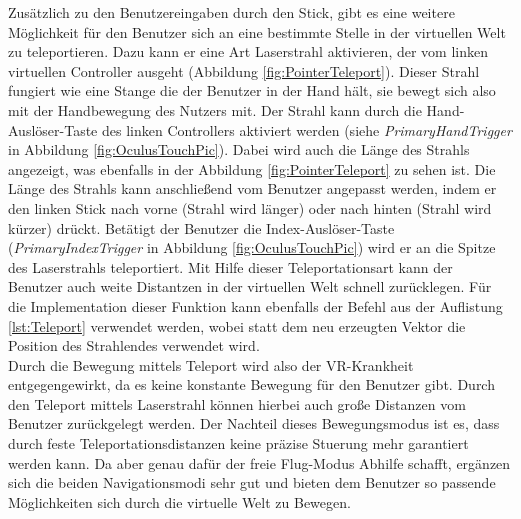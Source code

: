 Zusätzlich zu den Benutzereingaben durch den Stick, gibt es eine weitere Möglichkeit für den Benutzer sich an eine bestimmte Stelle in der virtuellen Welt zu teleportieren. Dazu kann er eine Art Laserstrahl aktivieren, der vom linken virtuellen Controller ausgeht (Abbildung \ref{fig:PointerTeleport}). Dieser Strahl fungiert wie eine Stange die der Benutzer in der Hand hält, sie bewegt sich also mit der Handbewegung des Nutzers mit. Der Strahl kann durch die Hand-Auslöser-Taste des linken Controllers aktiviert werden (siehe \textit{PrimaryHandTrigger} in Abbildung \ref{fig:OculusTouchPic}). Dabei wird auch die Länge des Strahls angezeigt, was ebenfalls in der Abbildung \ref{fig:PointerTeleport} zu sehen ist. Die Länge des Strahls kann anschließend vom Benutzer angepasst werden, indem er den linken Stick nach vorne (Strahl wird länger) oder nach hinten (Strahl wird kürzer) drückt. Betätigt der Benutzer die Index-Auslöser-Taste (\textit{PrimaryIndexTrigger} in Abbildung \ref{fig:OculusTouchPic}) wird er an die Spitze des Laserstrahls teleportiert. Mit Hilfe dieser Teleportationsart kann der Benutzer auch weite Distantzen in der virtuellen Welt schnell zurücklegen. Für die Implementation dieser Funktion kann ebenfalls der Befehl aus der Auflistung \ref{lst:Teleport} verwendet werden, wobei statt dem neu erzeugten Vektor die Position des Strahlendes verwendet wird.\\

Durch die Bewegung mittels Teleport wird also der VR-Krankheit entgegengewirkt, da es keine konstante Bewegung für den Benutzer gibt. Durch den Teleport mittels Laserstrahl können hierbei auch große Distanzen vom Benutzer zurückgelegt werden. Der Nachteil dieses Bewegungsmodus ist es, dass durch feste Teleportationsdistanzen keine präzise Stuerung mehr garantiert werden kann. Da aber genau dafür der freie Flug-Modus Abhilfe schafft, ergänzen sich die beiden Navigationsmodi sehr gut und bieten dem Benutzer so passende Möglichkeiten sich durch die virtuelle Welt zu Bewegen.
 

